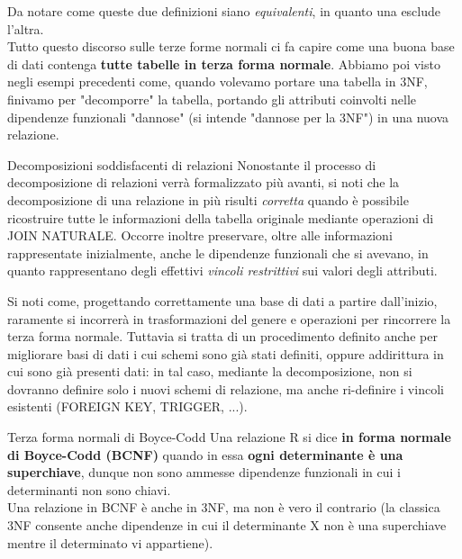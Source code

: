 \documentclass[12pt]{report}
\begin{document}
	Da notare come queste due definizioni siano \textit{equivalenti}, in quanto una esclude l'altra.\\
	Tutto questo discorso sulle terze forme normali ci fa capire come una buona base di dati contenga \textbf{tutte tabelle in terza forma normale}. Abbiamo poi visto negli esempi precedenti come, quando volevamo portare una tabella in 3NF, finivamo per "decomporre" la tabella, portando gli attributi coinvolti nelle dipendenze funzionali "dannose" (si intende "dannose per la 3NF") in una nuova relazione.
	\begin{proposizione}{Decomposizioni soddisfacenti di relazioni}{}
		Nonostante il processo di decomposizione di relazioni verrà formalizzato più avanti, si noti che la decomposizione di una relazione in più risulti \textit{corretta} quando è possibile ricostruire tutte le informazioni della tabella originale mediante operazioni di JOIN NATURALE. Occorre inoltre preservare, oltre alle informazioni rappresentate inizialmente, anche le dipendenze funzionali che si avevano, in quanto rappresentano degli effettivi \textit{vincoli restrittivi} sui valori degli attributi.
	\end{proposizione}
	Si noti come, progettando correttamente una base di dati a partire dall'inizio, raramente si incorrerà in trasformazioni del genere e operazioni per rincorrere la terza forma normale. Tuttavia si tratta di un procedimento definito anche per migliorare basi di dati i cui schemi sono già stati definiti, oppure addirittura in cui sono già presenti dati: in tal caso, mediante la decomposizione, non si dovranno definire solo i nuovi schemi di relazione, ma anche ri-definire i vincoli esistenti (FOREIGN KEY, TRIGGER, ...).
	
	\begin{definizione}{Terza forma normali di Boyce-Codd}{}
		Una relazione R si dice \textbf{in forma normale di Boyce-Codd (BCNF)} quando in essa \textbf{ogni determinante è una superchiave}, dunque non sono ammesse dipendenze funzionali in cui i determinanti non sono chiavi.\\
		Una relazione in BCNF è anche in 3NF, ma non è vero il contrario (la classica 3NF consente anche dipendenze in cui il determinante X non è una superchiave mentre il determinato vi appartiene). 
	\end{definizione}
	
\end{document}
